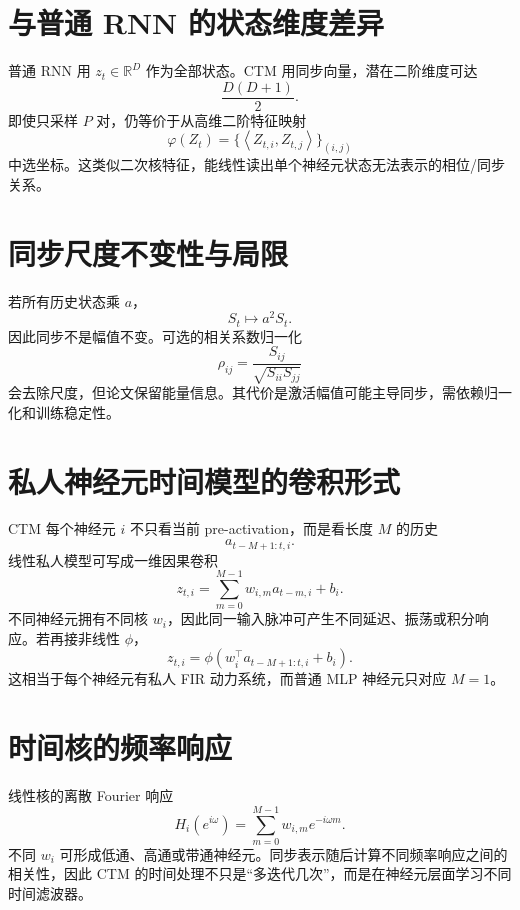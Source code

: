 \documentclass[UTF8,12pt,a4paper,fontset=none]{ctexart}
\numberwithin{equation}{section}
\newcommand{\R}{\mathbb{R}}
\newcommand{\ip}[2]{\left\langle #1,#2\right\rangle}
\begin{document}
\section{与普通 RNN 的状态维度差异}
普通 RNN 用 $z_t\in\R^D$ 作为全部状态。CTM 用同步向量，潜在二阶维度可达
\begin{equation}
 \frac{D(D+1)}2.
\end{equation}
即使只采样 $P$ 对，仍等价于从高维二阶特征映射
\begin{equation}
 \varphi(Z_t)=\{\ip{Z_{t,i}}{Z_{t,j}}\}_{(i,j)}
\end{equation}
中选坐标。这类似二次核特征，能线性读出单个神经元状态无法表示的相位/同步关系。

\section{同步尺度不变性与局限}
若所有历史状态乘 $a$，
\begin{equation}
 S_t\mapsto a^2S_t.
\end{equation}
因此同步不是幅值不变。可选的相关系数归一化
\begin{equation}
 \rho_{ij}=\frac{S_{ij}}{\sqrt{S_{ii}S_{jj}}}
\end{equation}
会去除尺度，但论文保留能量信息。其代价是激活幅值可能主导同步，需依赖归一化和训练稳定性。

\section{私人神经元时间模型的卷积形式}
CTM 每个神经元 $i$ 不只看当前 pre-activation，而是看长度 $M$ 的历史
\begin{equation}
 a_{t-M+1:t,i}.
\end{equation}
线性私人模型可写成一维因果卷积
\begin{equation}
 z_{t,i}=\sum_{m=0}^{M-1}w_{i,m}a_{t-m,i}+b_i.
\end{equation}
不同神经元拥有不同核 $w_i$，因此同一输入脉冲可产生不同延迟、振荡或积分响应。若再接非线性 $\phi$，
\begin{equation}
 z_{t,i}=\phi(w_i^\top a_{t-M+1:t,i}+b_i).
\end{equation}
这相当于每个神经元有私人 FIR 动力系统，而普通 MLP 神经元只对应 $M=1$。

\section{时间核的频率响应}
线性核的离散 Fourier 响应
\begin{equation}
 H_i(e^{i\omega})=\sum_{m=0}^{M-1}w_{i,m}e^{-i\omega m}.
\end{equation}
不同 $w_i$ 可形成低通、高通或带通神经元。同步表示随后计算不同频率响应之间的相关性，因此 CTM 的时间处理不只是“多迭代几次”，而是在神经元层面学习不同时间滤波器。
\end{document}
